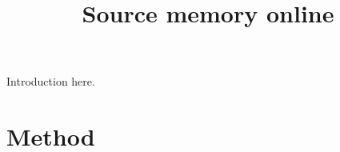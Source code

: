 \documentclass[10pt, a4paper, man]{apa6}
\title{Source memory online}
\begin{document}
\maketitle %

Introduction here.

\section{Method}
\end{document}
